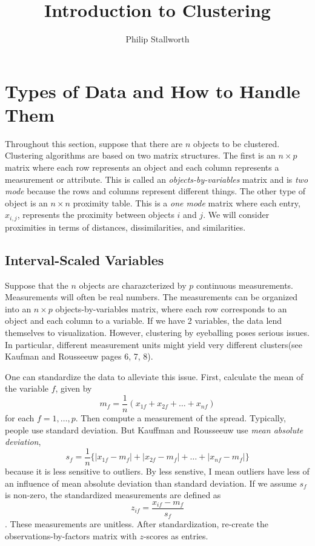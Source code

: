 \documentclass{article}
\title{Introduction to Clustering}
\author{Philip Stallworth}
\begin{document}
\maketitle
\section*{Types of Data and How to Handle Them}
Throughout this section, suppose that there are $n$ objects to be clustered. Clustering algorithms are based on two matrix structures. The first is an $n\times p$ matrix where each row represents an object and each column represents a measurement or attribute. This is called an {\it objects-by-variables} matrix and is {\it two mode} because the rows and columns represent different things. The other type of object is an $n\times n$ proximity table. This is a {\it one mode} matrix where each entry, $x_{i,j}$, represents the proximity between objects $i$ and $j$. We will consider proximities in terms of distances, dissimilarities, and similarities. 

\subsection*{Interval-Scaled Variables}
Suppose that the $n$ objects are charazcterized by $p$ continuous measurements. Measurements will often be real numbers. The measurements can be organized into an $n\times p$ objects-by-variables matrix, where each row corresponds to an object and each column to a variable. If we have 2 variables, the data lend themselves to visualization. However, clustering by eyeballing poses serious issues. In particular, different measurement units might  yield very different clusters(see Kaufman and Rousseeuw pages 6, 7, 8).

 One can standardize the data to alleviate this issue. First, calculate the mean of the variable $f$, given by $$m_f = \frac{1}{n}(x_{1f} + x_{2f} + \dots + x_{nf})$$ for each $f= 1, \dots, p$. Then compute a measurement of the spread. Typically, people use standard deviation. But Kauffman and Rousseeuw use {\it mean absolute deviation}, $$s_f = \frac{1}{n}\{ |x_{1f} - m_f| + |x_{2f} - m_f| + \dots + |x_{nf} - m_f|\}$$ because it is less sensitive to outliers. By less senstive, I mean outliers have less of an influence of mean absolute deviation than standard deviation. If we assume $s_f$ is non-zero, the standardized measurements are defined as $$z_{if} = \frac{x_{if} - m_f}{s_f}$$. These measurements are unitless. After standardization, re-create the observations-by-factors matrix with $z$-scores as entries. 
\end{document}
